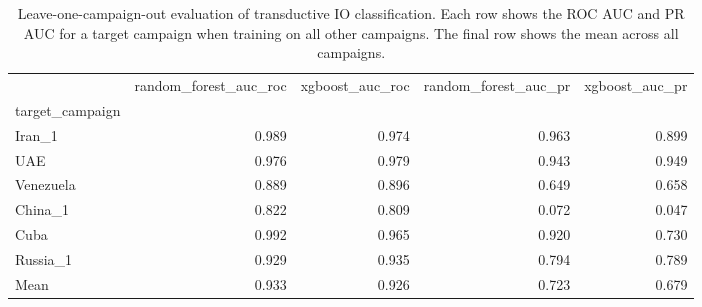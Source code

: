 \begin{table}
\caption{Leave-one-campaign-out evaluation of transductive IO classification. Each row shows the ROC AUC and PR AUC for a target campaign when training on all other campaigns. The final row shows the mean across all campaigns.}
\begin{tabular}{lrrrr}
\toprule
 & random_forest_auc_roc & xgboost_auc_roc & random_forest_auc_pr & xgboost_auc_pr \\
target_campaign &  &  &  &  \\
\midrule
Iran_1 & 0.989 & 0.974 & 0.963 & 0.899 \\
UAE & 0.976 & 0.979 & 0.943 & 0.949 \\
Venezuela & 0.889 & 0.896 & 0.649 & 0.658 \\
China_1 & 0.822 & 0.809 & 0.072 & 0.047 \\
Cuba & 0.992 & 0.965 & 0.920 & 0.730 \\
Russia_1 & 0.929 & 0.935 & 0.794 & 0.789 \\
Mean & 0.933 & 0.926 & 0.723 & 0.679 \\
\bottomrule
\end{tabular}
\end{table}
